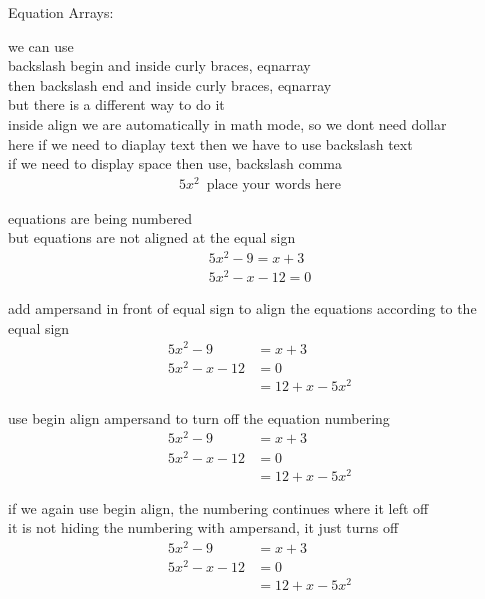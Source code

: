 \documentclass[24pt]{article}
\begin{document}
\vspace{2cm}

Equation Arrays:\\

\vspace{1cm}

we can use \\
backslash begin and inside curly braces, eqnarray\\
then backslash end and inside curly braces, eqnarray\\

but there is a different way to do it\\
inside align we are automatically in math mode, so we dont need dollar\\
here if we need to diaplay text then we have to use backslash text\\
if we need to display space then use, backslash comma\\
\begin{align}
5x^2\, \text{ place your words here}
\end{align}

\vspace{1cm}

equations are being numbered\\
but equations are not aligned at the equal sign\\
\begin{align}
5x^2-9=x+3\\
5x^2-x-12=0
\end{align}

\vspace{1cm}

add ampersand in front of equal sign to align the equations according to the equal sign\\
\begin{align}
5x^2-9&=x+3\\
5x^2-x-12&=0\\
&=12+x-5x^2
\end{align}


\vspace{1cm}

use begin align ampersand to turn off the equation numbering\\
\begin{align*}
5x^2-9&=x+3\\
5x^2-x-12&=0\\
&=12+x-5x^2
\end{align*}

\vspace{1cm}

if we again use begin align, the numbering continues where it left off\\
it is not hiding the numbering with ampersand, it just turns off\\
\begin{align}
5x^2-9&=x+3\\
5x^2-x-12&=0\\
&=12+x-5x^2
\end{align}
\end{document}
